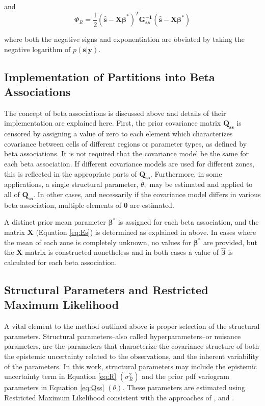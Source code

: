 \documentclass[11pt,oneside,onecolumn]{usgsreport}
\begin{document}
\begin{appendix}
and
\[
\Phi_{R}=\frac{1}{2}(\mathbf{\hat{s}-X\beta}^{*})^{T}\mathbf{G_{\mathbf{ss}}^{-1}}(\mathbf{\hat{s}-X\beta^{*}})
\]


where both the negative signs and exponentiation are obviated by taking
the negative logarithm of $p\left(\mathbf{s}|\mathbf{y}\right)$.


\subsection{Implementation of Partitions into Beta Associations}

The concept of beta associations is discussed above and details of
their implementation are explained here. First, the prior covariance
matrix $\mathbf{Q_{ss}}$ is censored by assigning a value of zero
to each element which characterizes covariance between cells of different
regions or parameter types, as defined by beta associations. It is
not required that the covariance model be the same for each beta association.
If different covariance models are used for different zones, this
is reflected in the appropriate parts of $\mathbf{Q_{ss}}.$ Furthermore,
in some applications, a single structural parameter, $\theta,$ may
be estimated and applied to all of $\mathbf{Q_{ss}.}$ In other cases,
and necessarily if the covariance model differs in various beta association,
multiple elements of $\mathbf{\theta}$ are estimated.

A distinct prior mean parameter $\mathbf{\beta^{*}}$ is assigned
for each beta association, and the matrix $\mathbf{X}$ (Equation
\ref{eq:Es}) is determined as explained in above. In cases where
the mean of each zone is completely unknown, no values for $\mathbf{\beta^{*}}$
are provided, but the $\mathbf{X}$ matrix is constructed nonetheless
and in both cases a value of $\mathbf{\hat{\beta}}$ is calculated
for each beta association.


\subsection{\label{sub:Structural-Parameters}Structural Parameters and Restricted
Maximum Likelihood}

A vital element to the method outlined above is proper selection of
the structural parameters. Structural parameters--also called hyperparameters--or
nuisance parameters, are the parameters that characterize the covariance
structure of both the epistemic uncertainty related to the observations,
and the inherent variability of the parameters. In this work, structural
parameters may include the epistemic uncertainty term in Equation
\ref{eq:R} $\left(\sigma_{R}^{2}\right)$ and the prior pdf variogram
parameters in Equation \ref{eq:Qss} $\left(\theta\right).$ These
parameters are estimated using Restricted Maximum Likelihood consistent
with the approaches of \citet{KitanidisVomvoris1983}, \citet{Kitanidis1995}
and \citet{LiCirpka2007}.


\end{appendix}
\end{document}
